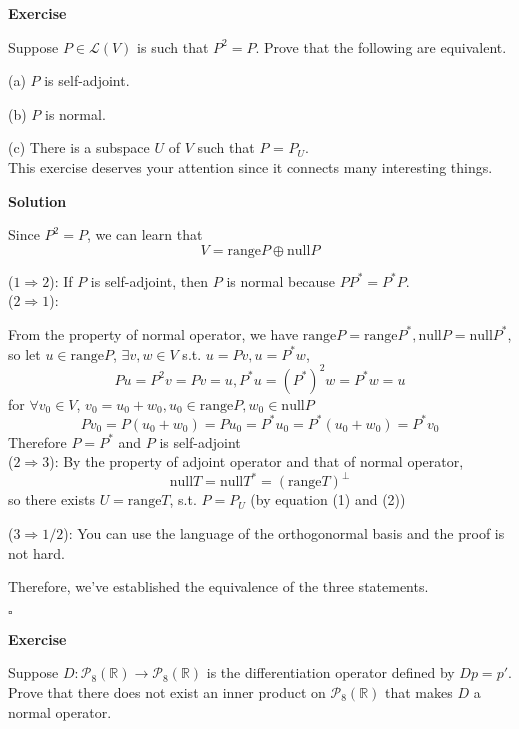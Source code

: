 \documentclass{article}
\newenvironment{exercise}{%
{\textbf{Exercise\\}
    }
}{
}
\newenvironment{solution}{%
{
    \textbf{Solution\\}
    }
}{
  \hfill $\square$ 
  \par\bigskip 
}
\newcommand{\RR}{\mathbb{R}}
\newcommand{\range}{\text{range}}
\newcommand{\n}{\text{null}}
\begin{document}
\begin{CJK}{UTF8}{gkai}
\begin{exercise}
    Suppose $P \in \mathcal{L}(V)$ is such that $P^2 = P$. Prove that the following are equivalent.

    (a) $P$ is self-adjoint.

    (b) $P$ is normal.

    (c) There is a subspace $U$ of $V$ such that $P$ = $P_U$.\\

    This exercise deserves your attention since it connects many interesting things.
\end{exercise}

\begin{solution}
    Since $P^2 = P$, we can learn that 
    \begin{equation}
        V = \range P \oplus \n P
    \end{equation}

    ($1 \Rightarrow 2$):
    If $P$ is self-adjoint, then $P$ is normal because $PP^* = P^*P$.\\

    ($2 \Rightarrow 1$):

    From the property of normal operator, we have $\range P = \range P^\ast, \n P = \n P^\ast$, so let $u \in \range P$, $\exists v,w \in V$ s.t. $u = Pv , u = P^\ast w$, 
    \[Pu = P^2 v = Pv = u, P^\ast u = (P^\ast)^2 w = P^\ast w = u\]
    for $\forall v_0 \in V$, $v_0 = u_0 + w_0, u_0 \in \range P , w_0 \in \n P$ 
    \[Pv_0 = P(u_0 + w_0) = Pu_0 = P^\ast u_0 = P^\ast(u_0 + w_0) = P^\ast v_0\] 
    Therefore $P = P^\ast$ and $P$ is self-adjoint\\ 

    ($2 \Rightarrow 3$):
    By the property of adjoint operator and that of normal operator,
    \begin{equation}
        \n T = \n T^\ast = (\range T)^\bot
    \end{equation}
    so there exists $U = \range T$, s.t. $P = P_U$ (by equation (1) and (2))

    ($3 \Rightarrow 1/2$):
    You can use the language of the orthogonormal basis and the proof is not hard.

Therefore, we've established the equivalence of the three statements.

\end{solution}

\begin{exercise}
    Suppose $D: \mathcal{P}_8(\RR) \to \mathcal{P}_8(\RR)$ is the differentiation operator defined by $Dp = p'$. Prove that there does not exist an inner product on $\mathcal{P}_8(\RR)$ that makes $D$ a normal operator.
\end{exercise}


\end{CJK}
\end{document}
